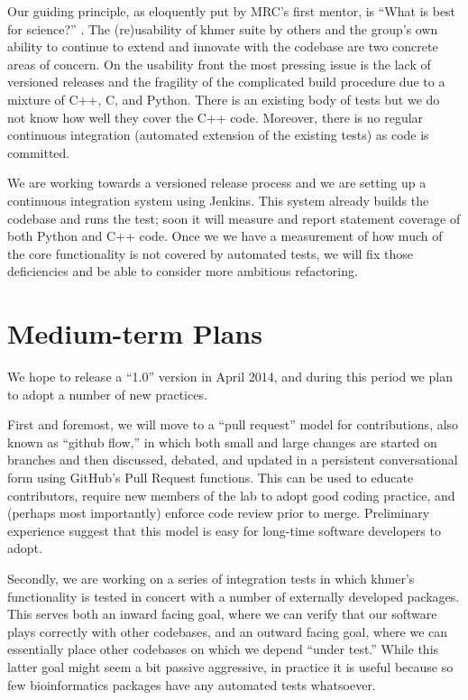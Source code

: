 \documentclass[11pt]{article}
\begin{document}
Our guiding principle, as eloquently put by MRC's first mentor, is
``What is best for science?'' \cite{Nagy2007}. The (re)usability of
khmer suite by others and the group's own ability to continue to
extend and innovate with the codebase are two concrete areas of
concern. On the usability front the most pressing issue is the
lack of versioned releases and the fragility of the complicated build
procedure due to a mixture of C++, C, and Python.  There is an
existing body of tests but we do not know how well they cover the C++
code.  Moreover, there is no regular continuous integration (automated
extension of the existing tests) as code is committed.

We are working towards a versioned release process and we are setting
up a continuous integration system using Jenkins.  This system already
builds the codebase and runs the test; soon it will measure and report
statement coverage of both Python and C++ code.  Once we we have a
measurement of how much of the core functionality is not covered by
automated tests, we will fix those deficiencies and be able to consider
more ambitious refactoring.

\section{Medium-term Plans}

We hope to release a ``1.0'' version in April 2014, and during this period
we plan to adopt a number of new practices.

First and foremost, we will move to a ``pull request'' model for
contributions, also known as ``github flow,'' in which both small and
large changes are started on branches and then discussed, debated, and
updated in a persistent conversational form using GitHub's Pull
Request functions.  This can be used to educate contributors, require
new members of the lab to adopt good coding practice, and (perhaps
most importantly) enforce code review prior to merge.  Preliminary
experience suggest that this model is easy for long-time software
developers to adopt.

Secondly, we are working on a series of integration tests in which
khmer's functionality is tested in concert with a number of externally
developed packages.  This serves both an inward facing goal, where we
can verify that our software plays correctly with other codebases, and
an outward facing goal, where we can essentially place other codebases
on which we depend ``under test.''  While this latter goal might seem
a bit passive aggressive, in practice it is useful because so few
bioinformatics packages have any automated tests whatsoever.  
\end{document}
